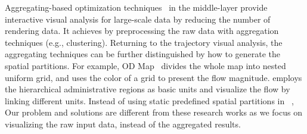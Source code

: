 Aggregating-based optimization techniques~\cite{zeng2013visualizing,von2015mobilitygraphs} in the middle-layer provide interactive visual analysis for large-scale data by
reducing the number of rendering data.
It achieves by preprocessing the raw data with aggregation techniques (e.g., clustering).
Returning to the trajectory visual analysis, the aggregating techniques can be further distinguished by how to generate the spatial partitions.
For example, OD Map~\cite{wood2010visualisation} divides the whole map into nested uniform grid, and uses the color of a grid to present the flow magnitude.
\cite{guo2009flow} employs the hierarchical administrative regions as basic units and visualize the flow by linking different units.
Instead of using static predefined spatial partitions in ~\cite{wood2010visualisation,guo2009flow},
Our problem and solutions are different from these research works as we focus on visualizing the raw input data, instead of the aggregated results.


